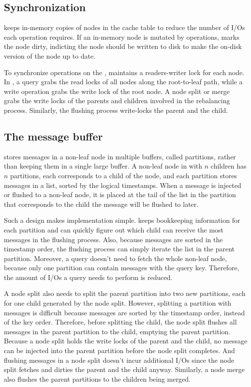 \subsection{Synchronization}
\label{sec:bg:impl:sync}

\Fti keeps in-memory copies of nodes in the cache table to reduce the
number of I/Os each operation requires.
If an in-memory node is mutated by \bet operations,
\fti marks the node dirty, indicting the node should be written to disk to make
the on-disk version of the node up to date.

To synchronize operations on the \bet,
\fti maintains a readers-writer lock for each \bet node.
In \fti, a query grabs the read locks of all nodes along the root-to-leaf path,
while a write operation grabs the write lock of the root node.
A node split or merge grabs the write locks of the parents and children
involved in the rebalancing process.
Similarly, the flushing process write-locks the parent and the child.

\subsection{The message buffer}
\label{sec:bg:impl:partition}

\Fti stores messages in a non-leaf node in multiple buffers, called partitions,
rather than keeping them in a single large buffer.
A non-leaf node in \fti with $n$ children has $n$ partitions, each corresponds
to a child of the node, and each partition stores messages in a list, sorted
by the logical timestamps.
When a message is injected or flushed to a non-leaf node, it is placed at the
tail of the list in the partition
that corresponds to the child the message will be flushed to later.

Such a design makes implementation simple.
\Fti keeps bookkeeping information for each partition and can
quickly figure out which child can receive the most messages
in the flushing process.
Also, because messages are sorted in the timestamp order, the flushing process
can simply iterate the list in the parent partition.
Moreover, a query doesn't need to fetch the whole non-leaf node,
because only one partition can contain messages with the query key.
Therefore, the amount of I/Os a query needs to perform is reduced.

A node split also needs to split the parent partition into two
new partitions, each for one child generated by the node split.
However, splitting a partition with messages is difficult because messages are
sorted by the timestamp order, instead of the key order.
Therefore, before splitting the child, the node split flushes all messages in
the parent partition to the child, emptying the parent partition.
Because a node split holds the write locks of the parent and the child,
no message can be injected into the parent partition
before the node split completes.
And flushing messages in a node split doesn't incur additional I/Os
since the node split fetches and dirties the parent and the child anyway.
Similarly, a node merge also flushes the parent partitions to the children being
merged.

